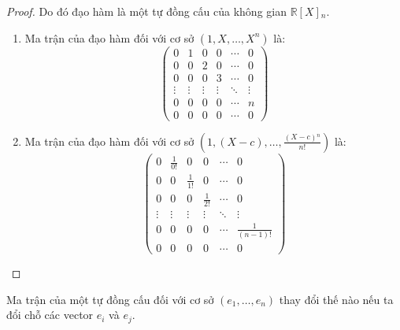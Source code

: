 \begin{proof}
    Do đó đạo hàm là một tự đồng cấu của không gian $\mathbb{R}[X]{}_{n}$.
    \begin{enumerate}[label = (\alph*)]
        \item Ma trận của đạo hàm đối với cơ sở $(1, X, \ldots, X^{n})$ là:
              \[
                  \begin{pmatrix}
                      0      & 1      & 0      & 0      & \cdots & 0      \\
                      0      & 0      & 2      & 0      & \cdots & 0      \\
                      0      & 0      & 0      & 3      & \cdots & 0      \\
                      \vdots & \vdots & \vdots & \vdots & \ddots & \vdots \\
                      0      & 0      & 0      & 0      & \cdots & n      \\
                      0      & 0      & 0      & 0      & \cdots & 0
                  \end{pmatrix}
              \]
        \item Ma trận của đạo hàm đối với cơ sở $(1, (X-c), \ldots, \frac{(X-c){}^{n}}{n!})$ là:
              \[
                  \begin{pmatrix}
                      0      & \frac{1}{0!} & 0            & 0            & \cdots & 0                \\
                      0      & 0            & \frac{1}{1!} & 0            & \cdots & 0                \\
                      0      & 0            & 0            & \frac{1}{2!} & \cdots & 0                \\
                      \vdots & \vdots       & \vdots       & \vdots       & \ddots & \vdots           \\
                      0      & 0            & 0            & 0            & \cdots & \frac{1}{(n-1)!} \\
                      0      & 0            & 0            & 0            & \cdots & 0
                  \end{pmatrix}
              \]
    \end{enumerate}
\end{proof}

\begin{exercise}
    Ma trận của một tự đồng cấu đối với cơ sở $(e_{1},\ldots,e_{n})$ thay đổi thế nào nếu ta đổi chỗ các vector $e_{i}$ và $e_{j}$.
\end{exercise}

